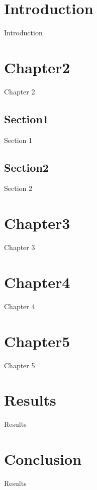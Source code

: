 \documentclass[frame, english]{idamasterthesis}
\author{Johan Rothsberg}
\begin{document}

\makeintropages

\chapter{Introduction}
Introduction
\chapter{Chapter2}
Chapter 2
\section{Section1}
Section 1
\section{Section2}
Section 2
\chapter{Chapter3}
Chapter 3
\chapter{Chapter4}
Chapter 4
\chapter{Chapter5}
Chapter 5
\chapter{Results}
Results
\chapter{Conclusion}
Results
\end{document}
